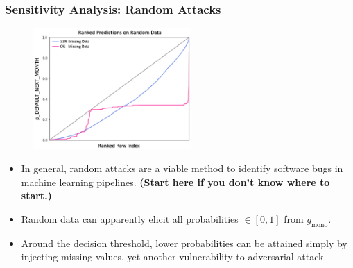 \documentclass[11pt,
               aspectratio=169,
               hyperref={colorlinks}
               ]{beamer}
\begin{document}
			\begin{frame}[t]
		
		
				\frametitle{\textbf{Sensitivity Analysis}: Random Attacks}
				\vspace{-15pt}
				\begin{figure}
					\begin{center}
						\includegraphics[height=130pt]{img/ra.png}
					\end{center}
				\end{figure}	
				\vspace{-10pt}
				\begin{itemize}\scriptsize
					\item In general, random attacks are a viable method to identify software bugs in machine learning pipelines. \textbf{(Start here if you don't know where to start.)}
					\item Random data can apparently elicit all probabilities $\in [0, 1]$ from $g_{\text{mono}}$.
					\item Around the decision threshold, lower probabilities can be attained simply by injecting missing values, yet another vulnerability to adversarial attack.
				\end{itemize}
				\normalsize
		
			\end{frame}
\end{document}
